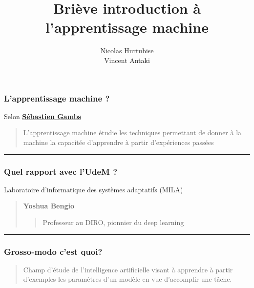 \documentclass[french]{beamer}
\title[Intro-ML]{Briève introduction à l'apprentissage machine} %
\author{Nicolas Hurtubise \\
Vincent Antaki} %
\institute[UdeM] %
{
*Ou introduction aux modèles d'apprentissages non-paramétrés \\ %
\medskip
\textit{hurtubin@iro.umontreal.ca
\\antakivi@iro.umontreal.ca} %
}
\date{} %
\begin{document}
\begin{frame}
\titlepage %
\end{frame}



\begin{frame}
\frametitle{L'apprentissage machine ?}

Selon \textbf{\href{http://www.iro.umontreal.ca/~aimeur/cours/ift6261/Survol_apprentissage_machine.pdf}{Sébastien
Gambs}}

\begin{quote}
L'apprentissage machine étudie les techniques permettant de donner à la machine la capacitée d'apprendre à partir d'expériences passées
\end{quote}
\begin{center}\rule{3in}{0.4pt}\end{center}
\end{frame}

\begin{frame}
\frametitle{Quel rapport avec l'UdeM ?}

{Laboratoire d'informatique des systèmes adaptatifs
(MILA)}

\begin{quote}
\textbf{Yoshua Bengio}

\begin{quote}
Professeur au DIRO, pionnier du deep learning
\end{quote}
\end{quote}

\begin{center}\rule{3in}{0.4pt}\end{center}

\end{frame}


\begin{frame}
\frametitle{Grosso-modo c'est quoi?}

\begin{quote}
Champ d'étude de l'intelligence artificielle visant à apprendre à partir d'exemples les paramètres d'un modèle en vue d'accomplir une tâche.
\end{quote}
\end{frame}
\end{document}
